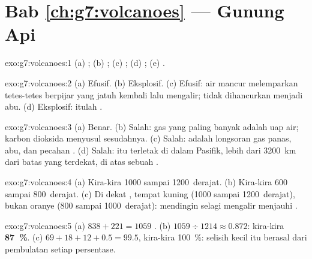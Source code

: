 \section*{Bab \ref{ch:g7:volcanoes} --- Gunung Api}

\begin{solution}{exo:g7:volcanoes:1}
(a) ; (b) ; (c) ; (d) ; (e) .
\end{solution}

\begin{solution}{exo:g7:volcanoes:2}
(a) Efusif. (b) Eksplosif. (c) Efusif: air mancur  melemparkan
tetes-tetes berpijar yang jatuh kembali lalu mengalir;  tidak
dihancurkan menjadi abu. (d) Eksplosif: itulah .
\end{solution}

\begin{solution}{exo:g7:volcanoes:3}
(a) Benar. (b) Salah: gas  yang paling banyak adalah uap air;
karbon dioksida menyusul sesudahnya. (c) Salah:  adalah
longsoran gas panas, abu, dan pecahan . (d) Salah: 
itu terletak di dalam  Pasifik, lebih dari 3200~km dari batas yang
terdekat, di atas sebuah .
\end{solution}

\begin{solution}{exo:g7:volcanoes:4}
(a) Kira-kira 1000 sampai 1200~derajat. (b) Kira-kira 600 sampai
800~derajat. (c) Di dekat , tempat  kuning (1000 sampai
1200~derajat), bukan oranye (800 sampai 1000~derajat):  mendingin
selagi mengalir menjauhi .
\end{solution}

\begin{solution}{exo:g7:volcanoes:5}
(a) $838 + 221 = 1059$ . (b) $1059 \div 1214 \approx 0.872$:
kira-kira \textbf{87~\%}. (c) $69 + 18 + 12 + 0.5 = 99.5$, kira-kira
100~\%: selisih kecil itu berasal dari pembulatan setiap persentase.
\end{solution}

